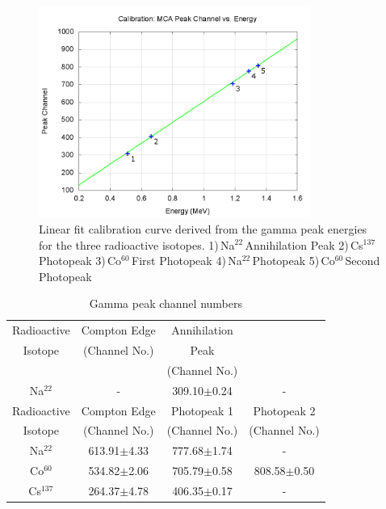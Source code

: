 \documentclass[aps,prl,twocolumn,superscriptaddress,nofootinbib]{revtex4-1}
\begin{document}
\begin{figure}[h!]
  \begin{center}
\centerline{\includegraphics[width=3.5in]{calib2.png}}
\caption{\small{Linear fit calibration curve derived from the gamma peak energies for the three radioactive isotopes. 1)\,Na$^{22}$\,Annihilation Peak 2)\,Cs$^{137}$\,Photopeak 3)\,Co$^{60}$\,First Photopeak 4)\,Na$^{22}$\,Photopeak 5)\,Co$^{60}$\,Second Photopeak \label{fig3}}}
  \end{center}
\end{figure}


\begin{table}[h!] 
\caption{Gamma peak channel numbers}
 \begin{center}   %
    \begin{tabular}{|c|c|c|c|} \hline   %

Radioactive  & Compton Edge   & Annihilation    & \\
Isotope      &  (Channel No.)     & Peak     &  \\
             &                 &   (Channel No.)  &   \\ \hline \hline
Na$^{22}$      & - & 309.10$\pm$0.24 & - \\ \hline\hline\hline
Radioactive  & Compton Edge & Photopeak 1    & Photopeak 2 \\
Isotope      &  (Channel No.)    & (Channel No.)   & (Channel No.) \\ \hline \hline
Na$^{22}$      & 613.91$\pm$4.33 & 777.68$\pm$1.74 & - \\ \hline
Co$^{60}$      & 534.82$\pm$2.06  & 705.79$\pm$0.58 & 808.58$\pm$0.50 \\ \hline
Cs$^{137}$     & 264.37$\pm$4.78 & 406.35$\pm$0.17 & - \\ \hline
     \end{tabular}
  \end{center}
  \label{tab2}
\end{table}
\end{document}
